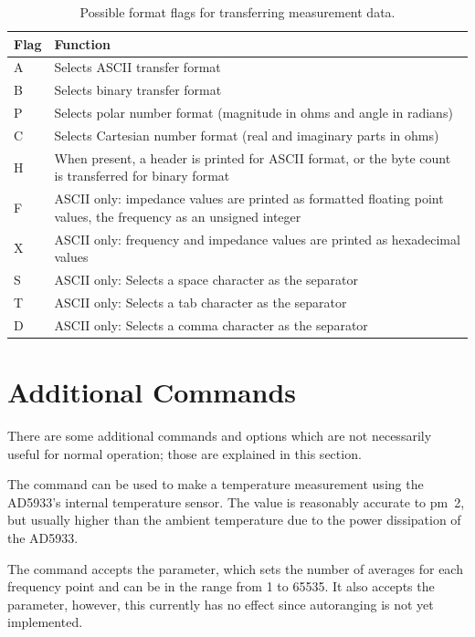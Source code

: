 \begin{table}[htpb]
  \caption{Possible format flags for transferring measurement data.}
  \centering
  \begin{tabular}{>{\ttfamily\bgroup}l<{\egroup} !{\color{MidnightBlue}\vline} p{10cm}}
    Flag  & Function \\ \hline \hline
    A     & Selects ASCII transfer format \\
    B     & Selects binary transfer format \\ \hline
    P     & Selects polar number format (magnitude in ohms and angle in radians) \\
    C     & Selects Cartesian number format (real and imaginary parts in ohms) \\ \hline
    H     & When present, a header is printed for ASCII format, or the byte count is transferred for binary format \\ \hline
    F     & ASCII only: impedance values are printed as formatted floating point values, the frequency as an unsigned integer \\
    X     & ASCII only: frequency and impedance values are printed as hexadecimal values \\ \hline
    S     & ASCII only: Selects a space character as the separator \\
    T     & ASCII only: Selects a tab character as the separator \\
    D     & ASCII only: Selects a comma character as the separator
  \end{tabular}
  \label{tab:format_flags}
\end{table}


\section{Additional Commands}

There are some additional commands and options which are not necessarily useful for normal operation; those are
explained in this section.

The  command can be used to make a temperature measurement using the AD5933's internal temperature
sensor. The value is reasonably accurate to \unit{\pm 2}{\celsius}, but usually higher than the ambient temperature due
to the power dissipation of the AD5933.

The  command accepts the  parameter, which sets the number of averages for each
frequency point and can be in the range from 1 to 65535.
It also accepts the  parameter, however, this currently has no effect since autoranging is
not yet implemented.

